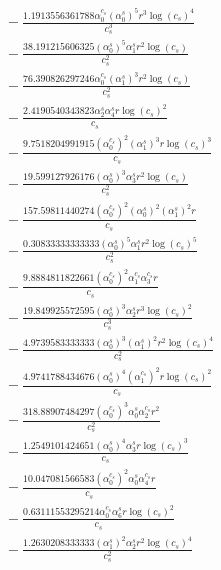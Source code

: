 \documentclass[10pt]{article}
\begin{document}
\begin{align*}
&{}  - \frac{1.1913556361788 \alpha_{0}^{c_s} \left(\alpha_{0}^s\right)^{5} r^{3} \log{\left(c_{s} \right)}^{4}}{c_{s}^{3}} \\
&{}  - \frac{38.191215606325 \left(\alpha_{0}^s\right)^{5} \alpha_{1}^s r^{2} \log{\left(c_{s} \right)}}{c_{s}^{2}} \\
&{}  - \frac{76.390826297246 \alpha_{0}^{c_s} \left(\alpha_{1}^s\right)^{3} r^{2} \log{\left(c_{s} \right)}}{c_{s}^{2}} \\
&{}  - \frac{2.4190540343823 \alpha_{2}^s \alpha_{4}^s r \log{\left(c_{s} \right)}^{2}}{c_{s}} \\
&{}  - \frac{9.7518204991915 \left(\alpha_{0}^{c_s}\right)^{2} \left(\alpha_{1}^s\right)^{3} r \log{\left(c_{s} \right)}^{3}}{c_{s}} \\
&{}  - \frac{19.599127926176 \left(\alpha_{0}^s\right)^{3} \alpha_{3}^s r^{2} \log{\left(c_{s} \right)}}{c_{s}^{2}} \\
&{}  - \frac{157.59811440274 \left(\alpha_{0}^{c_s}\right)^{2} \left(\alpha_{0}^s\right)^{2} \left(\alpha_{1}^s\right)^{2} r}{c_{s}} \\
&{}  - \frac{0.30833333333333 \left(\alpha_{0}^s\right)^{5} \alpha_{1}^s r^{2} \log{\left(c_{s} \right)}^{5}}{c_{s}^{2}} \\
&{}  - \frac{9.8884811822661 \left(\alpha_{0}^{c_s}\right)^{2} \alpha_{1}^{c_s} \alpha_{3}^{c_s} r}{c_{s}} \\
&{}  - \frac{19.849925572595 \left(\alpha_{0}^s\right)^{3} \alpha_{2}^s r^{3} \log{\left(c_{s} \right)}^{2}}{c_{s}^{3}} \\
&{}  - \frac{4.9739583333333 \left(\alpha_{0}^s\right)^{3} \left(\alpha_{1}^s\right)^{2} r^{2} \log{\left(c_{s} \right)}^{4}}{c_{s}^{2}} \\
&{}  - \frac{4.9741788434676 \left(\alpha_{0}^s\right)^{4} \left(\alpha_{1}^{c_s}\right)^{2} r \log{\left(c_{s} \right)}^{2}}{c_{s}} \\
&{}  - \frac{318.88907484297 \left(\alpha_{0}^{c_s}\right)^{3} \alpha_{0}^s \alpha_{2}^{c_s} r^{2}}{c_{s}^{2}} \\
&{}  - \frac{1.2549101424651 \left(\alpha_{0}^s\right)^{4} \alpha_{3}^s r \log{\left(c_{s} \right)}^{3}}{c_{s}} \\
&{}  - \frac{10.047081566583 \left(\alpha_{0}^{c_s}\right)^{2} \alpha_{0}^s \alpha_{4}^{c_s} r}{c_{s}} \\
&{}  - \frac{0.63111553295214 \alpha_{0}^{c_s} \alpha_{6}^s r \log{\left(c_{s} \right)}^{2}}{c_{s}} \\
&{}  - \frac{1.2630208333333 \left(\alpha_{1}^s\right)^{2} \alpha_{2}^s r^{2} \log{\left(c_{s} \right)}^{4}}{c_{s}^{2}} \\

\end{align*}
\end{document}
